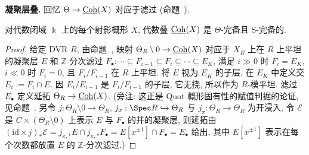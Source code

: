 \textbf{凝聚层叠.} 回忆 $\Theta\to\underline{\mathrm{Coh}}(X)$ 对应于滤过 (命题~).
\begin{proposition}\label{src:7.9.30}
对代数闭域 $\Bbbk$ 上的每个射影概形 $X$, 代数叠 $\underline{\mathrm{Coh}}(X)$ 是 $\Theta$-完备且 S-完备的.
\end{proposition}
\begin{proof}
给定 DVR $R$, 由命题~, 映射 $\Theta_R\setminus0\to\underline{\mathrm{Coh}}(X)$ 对应于 $X_R$ 上在 $R$ 上平坦的凝聚层 $E$ 和 $\mathbb Z$-分次滤过 $F_\bullet:\cdots\subseteq F_{i-1}\subseteq F_i\subseteq\cdots\subseteq E_K$, 满足 $i\gg0$ 时 $F_i=E_K$, $i\ll0$ 时 $F_i=0$, 且 $F_i/F_{i-1}$ 在 $R$ 上平坦. 将 $E$ 视为 $E_K$ 的子层, 在 $E_K$ 中定义交 $E_i:=F_i\cap E$. 因 $E_i/E_{i-1}$ 是 $F_i/F_{i-1}$ 的子层, 它无挠, 所以作为 $R$-模平坦. 滤过 $E_\bullet$ 定义延拓 $\Theta_R\to\underline{\mathrm{Coh}}(X)$. (旁注: 这正是 Quot 概形固有性的赋值判据的论证, 见命题~. 另令 $j:\Theta_R\setminus0\to\Theta_R$, $j_x:\Spec R\hookrightarrow\Theta_R$ 与 $j_\pi:\Theta_R\to\Theta_R$ 为开浸入, 令 $\mathcal E$ 是 $C\times(\Theta_R\setminus0)$ 上表示 $E$ 与 $F_\bullet$ 的并的凝聚层, 则延拓由 $(\mathrm{id}\times j)_*\mathcal E=j_{x,*}E\cap j_{\pi,*}F_\bullet=E[x^{\pm1}]\cap F_\bullet=E_\bullet$ 给出, 其中 $E[x^{\pm1}]$ 表示在每个次数都放置 $E$ 的 $\mathbb Z$-分次滤过.)


\end{proof}
